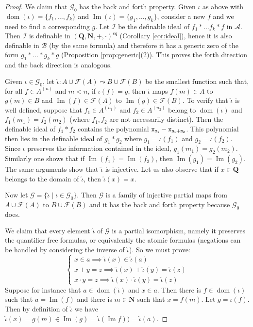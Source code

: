 \documentclass[10pt,a4paper]{amsart}
\newcommand{\F}{\mathcal{F}}
\newcommand{\ca}{\mathcal}
\newcommand{\dom}{\operatorname{dom}}
\newcommand{\hQ}{\mathbf Q}
\newcommand{\hn}{\mathbf N}
\newcommand{\ideal}[1]{\ca #1}
\newcommand{\img}{\operatorname{Im}}
\newcommand{\pto}{\leadsto} %
\begin{document}
\begin{proof}
We claim that $\ca G_0$ has the back and forth property. 
Given $\iota$ as above with $\dom(\iota) = \{f_1, \ldots, f_k\}$ and $\img(\iota) = \{g_1, \ldots, g_k\}$, consider a new $f$ and we need to find a corresponding $g$. Let $\ideal I$ be the definable ideal of  $f_1*\ldots f_k*f$ in $\ca A$. Then $\ideal I$ is definable in $(\hQ,\hn, +,\cdot)^{eq}$ (Corollary \ref{cor:ideal}), hence it is also definable in $\ca B$ (by the same formula) and therefore it has a generic zero of the form $g_1* \ldots * g_k*g$ (Proposition \ref{prop:generic}(2)). This proves the forth direction and the back direction is analogous. 

\bigskip 
Given $\iota \in \ca G_0$, let $\hat \iota: A \cup \F(A) \pto B \cup \F(B)$ be the smallest function such that, for all $f\in A^{(n)}$ and $m<n$, if $\iota(f) = g$, then $\hat \iota$ maps $f(m)\in A$ to $g(m)\in B$ and $\img (f) \in \F(A)$ to $\img(g) \in \F(B)$. 
To verify that $\hat \iota$ is well defined, suppose that $f_1\in A^{(n_1)}$ and $f_2\in A^{(n_2)}$ belong to $\dom(\iota)$ and $f_1(m_1) = f_2(m_2)$ (where $f_1,f_2$ are not necessarily distinct). Then the definable ideal of $f_1*f_2$ contains the polynomial $\tt x_{m_1} - \tt x_{n_1+m_2}$. This polynomial then lies in the definable ideal of $g_1*g_2$ where $g_1 = \iota(f_1)$ and $g_2 = \iota(f_2)$. Since $\iota$ preserves the information contained in the ideal, $g_1(m_1) = g_2(m_2)$. Similarly one shows that if $\img(f_1) = \img(f_2)$, then $\img(g_1) = \img(g_2)$. The same arguments show that $\hat \iota$ is injective. Let us also observe that if $x\in \hQ$ belongs to the domain of $\hat \iota$, then $\hat \iota (x) = x$. 


Now let $\ca G = \{\hat \iota \mid \iota \in \ca G_0\}$. Then $\ca G$ is a family of injective partial maps from $A\cup \F(A)$ to $B \cup \F(B)$ and it has the back and forth property because $\ca G_0$ does. 

We claim that every element $\hat \iota$ of $\ca G$ is a partial isomorphism, namely it preserves the quantifier free formulas, or equivalently the atomic formulas (negations can be handled by considering the inverse of $\hat \iota$). So we must prove: 
%
$$
\begin{cases}
x\in a \implies \hat \iota(x) \in \hat \iota(a)\\
x+y = z \implies \hat \iota(x) + \hat \iota(y) = \hat \iota(z)\\
x\cdot y= z \implies \hat \iota(x)\cdot \hat \iota(y) = \hat \iota(z)
\end{cases}
$$
Suppose for instance that $a\in \dom(\hat \iota)$ and $x\in a$. Then there is $f\in \dom(\iota)$ such that $a = \img(f)$ and there is $m\in \hn$ such that $x = f(m)$. Let $g = \iota(f)$. Then by definition of $\hat \iota$ we have $\hat \iota (x) = g(m) \in \img (g) = \hat \iota (\img f)) = \hat \iota (a)$. 


\end{proof}
\end{document}
